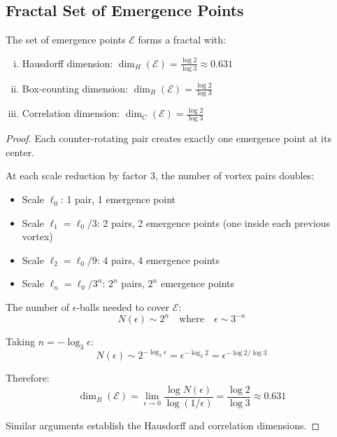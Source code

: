 \subsection{Fractal Set of Emergence Points}

\begin{theorem}\label{thm:emergence-fractal}
The set of emergence points $\mathcal{E}$ forms a fractal with:
\begin{enumerate}[(i)]
\item Hausdorff dimension: $\dim_H(\mathcal{E}) = \frac{\log 2}{\log 3} \approx 0.631$
\item Box-counting dimension: $\dim_B(\mathcal{E}) = \frac{\log 2}{\log 3}$
\item Correlation dimension: $\dim_C(\mathcal{E}) = \frac{\log 2}{\log 3}$
\end{enumerate}
\end{theorem}

\begin{proof}
Each counter-rotating pair creates exactly one emergence point at its center.

At each scale reduction by factor 3, the number of vortex pairs doubles:
\begin{itemize}
\item Scale $\ell_0$: 1 pair, 1 emergence point
\item Scale $\ell_1 = \ell_0/3$: 2 pairs, 2 emergence points (one inside each previous vortex)
\item Scale $\ell_2 = \ell_0/9$: 4 pairs, 4 emergence points
\item Scale $\ell_n = \ell_0/3^n$: $2^n$ pairs, $2^n$ emergence points
\end{itemize}

The number of $\epsilon$-balls needed to cover $\mathcal{E}$:
\begin{equation}
N(\epsilon) \sim 2^n \quad \text{where} \quad \epsilon \sim 3^{-n}
\end{equation}

Taking $n = -\log_3 \epsilon$:
\begin{equation}
N(\epsilon) \sim 2^{-\log_3 \epsilon} = \epsilon^{-\log_3 2} = \epsilon^{-\log 2/\log 3}
\end{equation}

Therefore:
\begin{equation}
\dim_B(\mathcal{E}) = \lim_{\epsilon \to 0} \frac{\log N(\epsilon)}{\log(1/\epsilon)} = \frac{\log 2}{\log 3} \approx 0.631
\end{equation}

Similar arguments establish the Hausdorff and correlation dimensions.
\end{proof}


